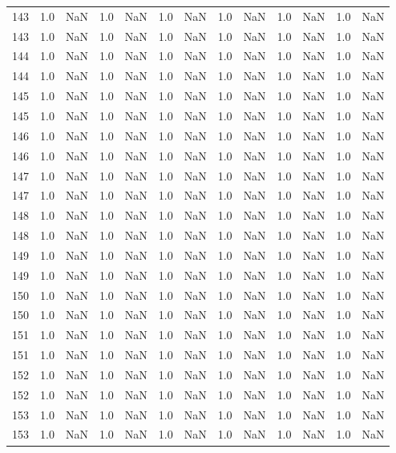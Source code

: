 \begin{tabular}{lrrrrrrrrrrrr}
143 & 1.0 & NaN & 1.0 & NaN & 1.0 & NaN & 1.0 & NaN & 1.0 & NaN & 1.0 & NaN \\
143 & 1.0 & NaN & 1.0 & NaN & 1.0 & NaN & 1.0 & NaN & 1.0 & NaN & 1.0 & NaN \\
144 & 1.0 & NaN & 1.0 & NaN & 1.0 & NaN & 1.0 & NaN & 1.0 & NaN & 1.0 & NaN \\
144 & 1.0 & NaN & 1.0 & NaN & 1.0 & NaN & 1.0 & NaN & 1.0 & NaN & 1.0 & NaN \\
145 & 1.0 & NaN & 1.0 & NaN & 1.0 & NaN & 1.0 & NaN & 1.0 & NaN & 1.0 & NaN \\
145 & 1.0 & NaN & 1.0 & NaN & 1.0 & NaN & 1.0 & NaN & 1.0 & NaN & 1.0 & NaN \\
146 & 1.0 & NaN & 1.0 & NaN & 1.0 & NaN & 1.0 & NaN & 1.0 & NaN & 1.0 & NaN \\
146 & 1.0 & NaN & 1.0 & NaN & 1.0 & NaN & 1.0 & NaN & 1.0 & NaN & 1.0 & NaN \\
147 & 1.0 & NaN & 1.0 & NaN & 1.0 & NaN & 1.0 & NaN & 1.0 & NaN & 1.0 & NaN \\
147 & 1.0 & NaN & 1.0 & NaN & 1.0 & NaN & 1.0 & NaN & 1.0 & NaN & 1.0 & NaN \\
148 & 1.0 & NaN & 1.0 & NaN & 1.0 & NaN & 1.0 & NaN & 1.0 & NaN & 1.0 & NaN \\
148 & 1.0 & NaN & 1.0 & NaN & 1.0 & NaN & 1.0 & NaN & 1.0 & NaN & 1.0 & NaN \\
149 & 1.0 & NaN & 1.0 & NaN & 1.0 & NaN & 1.0 & NaN & 1.0 & NaN & 1.0 & NaN \\
149 & 1.0 & NaN & 1.0 & NaN & 1.0 & NaN & 1.0 & NaN & 1.0 & NaN & 1.0 & NaN \\
150 & 1.0 & NaN & 1.0 & NaN & 1.0 & NaN & 1.0 & NaN & 1.0 & NaN & 1.0 & NaN \\
150 & 1.0 & NaN & 1.0 & NaN & 1.0 & NaN & 1.0 & NaN & 1.0 & NaN & 1.0 & NaN \\
151 & 1.0 & NaN & 1.0 & NaN & 1.0 & NaN & 1.0 & NaN & 1.0 & NaN & 1.0 & NaN \\
151 & 1.0 & NaN & 1.0 & NaN & 1.0 & NaN & 1.0 & NaN & 1.0 & NaN & 1.0 & NaN \\
152 & 1.0 & NaN & 1.0 & NaN & 1.0 & NaN & 1.0 & NaN & 1.0 & NaN & 1.0 & NaN \\
152 & 1.0 & NaN & 1.0 & NaN & 1.0 & NaN & 1.0 & NaN & 1.0 & NaN & 1.0 & NaN \\
153 & 1.0 & NaN & 1.0 & NaN & 1.0 & NaN & 1.0 & NaN & 1.0 & NaN & 1.0 & NaN \\
153 & 1.0 & NaN & 1.0 & NaN & 1.0 & NaN & 1.0 & NaN & 1.0 & NaN & 1.0 & NaN \\

\end{tabular}
